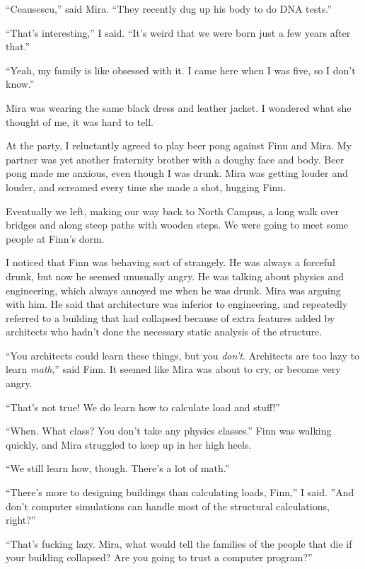 ``Ceausescu,'' said Mira.  ``They recently dug up his body to do DNA tests.''  

``That's interesting,'' I said.  ``It's weird that we were born just a few years
after that.''  

``Yeah, my family is like obsessed with it.  I came here when I was five, so I
don't know.''

Mira was wearing the same black dress and leather jacket.  I wondered what she
thought of me, it was hard to tell.

At the party, I reluctantly agreed to play beer pong against Finn and Mira.  My
partner was yet another fraternity brother with a doughy face and body.  Beer
pong made me anxious, even though I was drunk.  Mira was getting louder and
louder, and screamed every time she made a shot, hugging Finn.

Eventually we left, making our way back to North Campus, a long walk over
bridges and along steep paths with wooden steps.  We were going to meet
some people at Finn's dorm. 

I noticed that Finn was behaving sort of strangely.  He was always a forceful
drunk, but now he seemed unusually angry.  He was talking about physics and
engineering, which always annoyed me when he was drunk.  Mira was arguing with
him.  He said that architecture was inferior to engineering, and repeatedly
referred to a building that had collapsed because of extra features added by
architects who hadn't done the necessary static analysis of the structure.

``You architects could learn these things, but you \textit{don't}.  Architects
are too lazy to learn \textit{math},'' said Finn.  It seemed like Mira was
about to cry, or become very angry.

``That's not true!  We do learn how to calculate load and stuff!''

``When.  What class?  You don't take any physics classes.''  Finn was walking
quickly, and Mira struggled to keep up in her high heels.

``We still learn how, though.  There's a lot of math.''

``There's more to designing buildings than calculating loads, Finn,'' I said.
''And don't computer simulations can handle most of the structural calculations,
right?''

``That's fucking lazy.  Mira, what would tell the families of the people that
die if your building collapsed?  Are you going to trust a computer program?'' 

